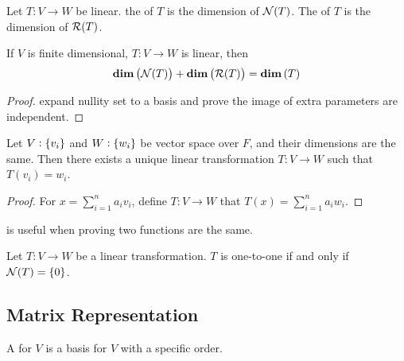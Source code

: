 \begin{definition}
	Let $T: V \rightarrow W$ be linear. the   of $T$ is the dimension of $\mathcal{N}(T)$. The  \label{rankdefinition} of $T$ is the dimension of $\mathcal{R}(T)$.
\end{definition}

\begin{theorem}
	If $V$ is finite dimensional, $T:V\rightarrow W$ is linear, then
	\begin{equation}
		\displaystyle \mathbf{dim}\left( \mathcal{N}(T) \right) + \displaystyle \mathbf{dim}\left( \mathcal{R}(T) \right) = \displaystyle \mathbf{dim}\left( T \right)
	\end{equation}
\end{theorem}

\begin{proof}
	expand nullity set to a basis and prove the image of extra parameters are independent.
\end{proof}

\begin{theorem}\label{uniquelineartransformation}
	Let $V:\set{v_i}$ and $W:\set{w_i}$ be vector space over $F$, and their dimensions are the same. Then there exists a unique linear transformation $T:V \rightarrow W$ such that $T(v_i) = w_i$.
\end{theorem}

\begin{proof}
    For $\displaystyle x = \sum_{i=1}^{n} a_i v_i$, define $T:V \rightarrow W$ that $\displaystyle T(x) = \sum_{i=1}^n a_i w_i$.
\end{proof}

 is useful when proving two functions are the same.


\begin{theorem}
    Let $T: V \rightarrow W$ be a linear transformation. $T$ is one-to-one if and only if $\mathcal{N}(T) = \{ 0 \}$.    
\end{theorem}







\subsection{Matrix Representation}

\begin{definition}
	A   for $V$ is a basis for $V$ with a specific order.
\end{definition}

